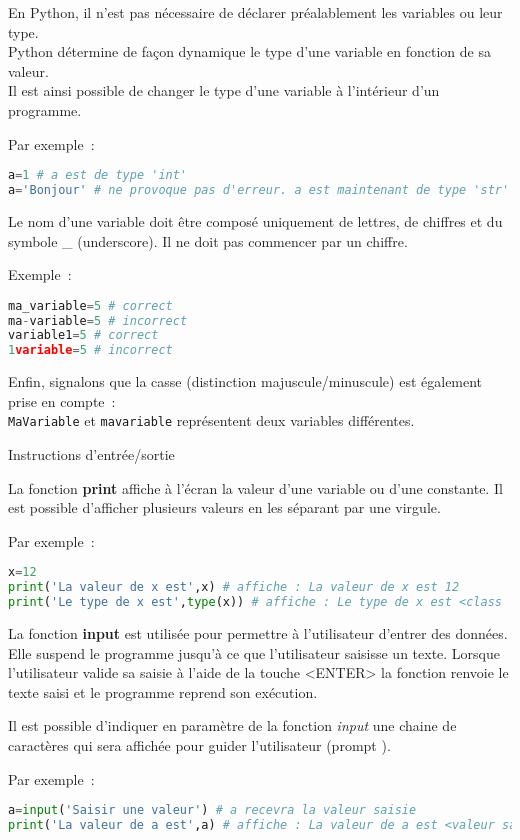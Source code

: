 En Python, il n'est pas nécessaire de déclarer préalablement les variables ou leur type. \\
Python détermine de façon dynamique le type d'une variable en fonction de sa valeur. \\
Il est ainsi possible de changer le type d'une variable à l'intérieur d'un programme.
\par
Par exemple~:
 \begin{lstlisting}[language=Python]
a=1 # a est de type 'int'
a='Bonjour' # ne provoque pas d'erreur. a est maintenant de type 'str'
\end{lstlisting}
Le nom d'une variable doit être composé uniquement de lettres, de chiffres et du symbole \og \_ \fg{} (underscore). Il ne doit pas commencer par un chiffre.
\par
Exemple~:
\begin{lstlisting}[language=Python]
ma_variable=5 # correct
ma-variable=5 # incorrect
variable1=5 # correct
1variable=5 # incorrect
\end{lstlisting}
Enfin, signalons que la casse (distinction majuscule/minuscule) est également prise en compte~: \\
\texttt{MaVariable} et \texttt{mavariable} représentent deux variables différentes.
\begin{h3}Instructions d'entrée/sortie\end{h3}
La fonction \textbf{print} affiche à l'écran la valeur d'une variable ou d'une constante. Il est possible d'afficher plusieurs valeurs en les séparant par une virgule.
\par
Par exemple~:
\begin{lstlisting}[language=Python]
x=12
print('La valeur de x est',x) # affiche : La valeur de x est 12
print('Le type de x est',type(x)) # affiche : Le type de x est <class 'int'>
\end{lstlisting}
La fonction \textbf{input} est utilisée pour permettre à l'utilisateur d'entrer des données. Elle suspend le programme jusqu'à ce que l'utilisateur saisisse un texte. Lorsque l'utilisateur valide sa saisie à l'aide de la touche <ENTER> la fonction renvoie le texte saisi et le programme reprend son exécution.
\par
Il est possible d'indiquer en paramètre de la fonction \textit{input} une chaine de caractères qui sera affichée pour guider l'utilisateur (\og prompt \fg{}).
\par
Par exemple~:
\begin{lstlisting}[language=Python]
a=input('Saisir une valeur') # a recevra la valeur saisie
print('La valeur de a est',a) # affiche : La valeur de a est <valeur saisie par l'utilisateur>
\end{lstlisting}
